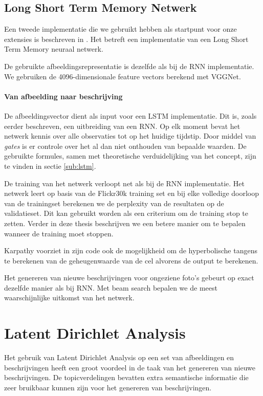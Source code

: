 \subsection{Long Short Term Memory Netwerk}
\label{sec:lstm}
Een tweede implementatie die we gebruikt hebben als startpunt voor onze extensies is beschreven in . Het betreft een implementatie van een Long Short Term Memory neuraal netwerk. 

De gebruikte afbeeldingsrepresentatie is dezelfde als bij de RNN implementatie. We gebruiken de 4096-dimensionale feature vectors berekend met VGGNet. 

\paragraph{Van afbeelding naar beschrijving}
De afbeeldingsvector dient als input voor een LSTM implementatie. Dit is, zoals eerder beschreven, een uitbreiding van een RNN. Op elk moment bevat het netwerk kennis over alle observaties tot op het huidige tijdstip. Door middel van \emph{gates} is er controle over het al dan niet onthouden van bepaalde waarden. De gebruikte formules, samen met theoretische verduidelijking van het concept, zijn te vinden in sectie \ref{sub:lstm}.

De training van het netwerk verloopt net als bij de RNN implementatie. Het netwerk leert op basis van de Flickr30k training set en bij elke volledige doorloop van de trainingset berekenen we de perplexity van de resultaten op de validatieset. Dit kan gebruikt worden als een criterium om de training stop te zetten. Verder in deze thesis beschrijven we een betere manier om te bepalen wanneer de training moet stoppen. 

Karpathy voorziet in zijn code ook de mogelijkheid om de hyperbolische tangens te berekenen van de geheugenwaarde van de cel alvorens de output te berekenen. 

Het genereren van nieuwe beschrijvingen voor ongeziene foto's gebeurt op exact dezelfde manier als bij RNN. Met beam search bepalen we de meest waarschijnlijke uitkomst van het netwerk.



\section{Latent Dirichlet Analysis}
Het gebruik van Latent Dirichlet Analysis op een set van afbeeldingen en beschrijvingen heeft een groot voordeel in de taak van het genereren van nieuwe beschrijvingen. De topicverdelingen bevatten extra semantische informatie die zeer bruikbaar kunnen zijn voor het genereren van beschrijvingen.

